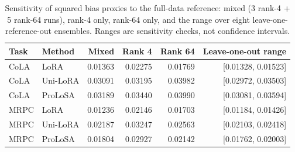 \begin{table}[t]
\centering\small
\caption{Sensitivity of squared bias proxies to the full-data reference: mixed (3 rank-4 + 5 rank-64 runs), rank-4 only, rank-64 only, and the range over eight leave-one-reference-out ensembles. Ranges are sensitivity checks, not confidence intervals.}
\label{tab:e3_reference}
\begin{tabular}{llrrrr}
\toprule
Task & Method & Mixed & Rank 4 & Rank 64 & Leave-one-out range \\
\midrule
CoLA & LoRA & 0.01363 & 0.02275 & 0.01769 & [0.01328, 0.01523] \\
CoLA & Uni-LoRA & 0.03091 & 0.03195 & 0.03982 & [0.02972, 0.03503] \\
CoLA & ProLoSA & 0.03189 & 0.03440 & 0.03990 & [0.03081, 0.03594] \\
MRPC & LoRA & 0.01236 & 0.02146 & 0.01703 & [0.01184, 0.01426] \\
MRPC & Uni-LoRA & 0.02187 & 0.03247 & 0.02563 & [0.02103, 0.02418] \\
MRPC & ProLoSA & 0.01804 & 0.02927 & 0.02142 & [0.01762, 0.02003] \\
\bottomrule
\end{tabular}
\end{table}
